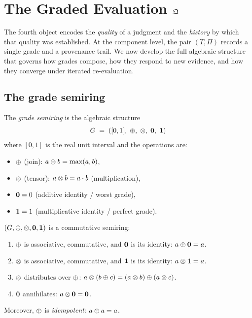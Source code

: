 \chapter{The Graded Evaluation \texorpdfstring{$\mathfrak{Q}$}{Q}}
\label{ch:geval}

The fourth object encodes the \emph{quality} of a judgment and the
\emph{history} by which that quality was established.  At the
component level, the pair $(T,\Pi)$ records a single grade and a
provenance trail.  We now develop the full algebraic structure that
governs how grades compose, how they respond to new evidence, and how
they converge under iterated re-evaluation.

\section{The grade semiring}
\label{sec:grade-semiring}

\begin{definition}
\label{def:grade-semiring-p2}
The \emph{grade semiring} is the algebraic structure
\[
  G \;=\; ([0,1],\; \oplus,\; \otimes,\; \mathbf{0},\; \mathbf{1})
\]
where $[0,1]$ is the real unit interval and the operations are:
\begin{itemize}[nosep]
\item $\oplus$ (join): $a \oplus b = \max(a,b)$,
\item $\otimes$ (tensor): $a \otimes b = a \cdot b$ (multiplication),
\item $\mathbf{0} = 0$ (additive identity / worst grade),
\item $\mathbf{1} = 1$ (multiplicative identity / perfect grade).
\end{itemize}
\end{definition}

\begin{proposition}
\label{prop:semiring}
$(G, \oplus, \otimes, \mathbf{0}, \mathbf{1})$ is a commutative semiring:
\begin{enumerate}[label=(\alph*),nosep]
\item $\oplus$ is associative, commutative, and $\mathbf{0}$ is its identity:
  $a \oplus \mathbf{0} = a$.
\item $\otimes$ is associative, commutative, and $\mathbf{1}$ is its identity:
  $a \otimes \mathbf{1} = a$.
\item $\otimes$ distributes over $\oplus$:
  $a \otimes (b \oplus c) = (a \otimes b) \oplus (a \otimes c)$.
\item $\mathbf{0}$ annihilates: $a \otimes \mathbf{0} = \mathbf{0}$.
\end{enumerate}
Moreover, $\oplus$ is \emph{idempotent}: $a \oplus a = a$.
\end{proposition}

